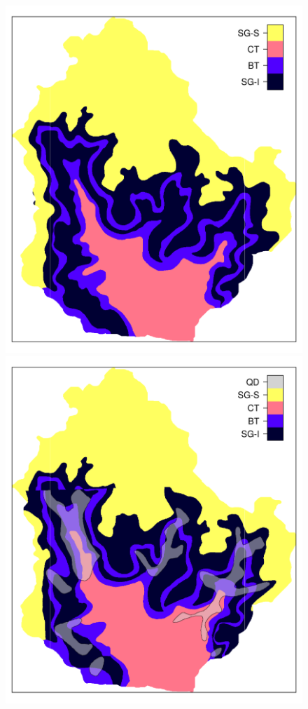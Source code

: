 \begin{figure}[!ht]
\centering
\begin{minipage}[b]{0.45\textwidth}
\subcaption{}
\centering
\includegraphics[width = \textwidth]{fig/chap05-geo-old}
\end{minipage}
\begin{minipage}[b]{0.45\textwidth}
\subcaption{}
\centering
\includegraphics[width = \textwidth]{fig/chap05-geo-new}

\end{minipage}
\end{figure}
